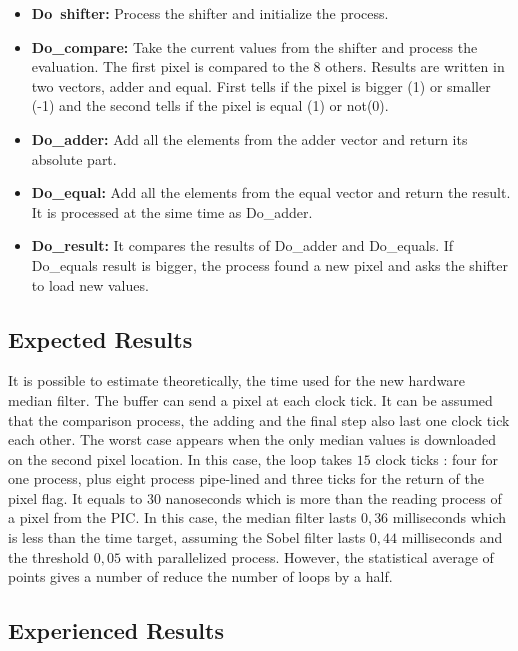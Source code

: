 \documentclass[journal]{IEEEtran}
\begin{document}
\begin{itemize}
\item \textbf{Do\ shifter:} Process the shifter and initialize the process.
\item \textbf{Do\_compare:} Take the current values from the shifter and process the evaluation. The first pixel is compared to the 8 others. Results are written in two vectors, adder and equal. First tells if the pixel is bigger (1) or smaller (-1) and the second tells if the pixel is equal (1) or not(0).

\item \textbf{Do\_adder:} Add all the elements from the adder vector and return its absolute part.
\item \textbf{Do\_equal:} Add all the elements from the equal vector and return the result. It is processed at the sime time as Do\_adder.
\item \textbf{Do\_result:} It compares the results of Do\_adder and Do\_equals. If Do\_equals result is bigger, the process found a new pixel and asks the shifter to load new values.
\end{itemize}

\subsection{Expected Results}

It is possible to estimate theoretically, the time used for the new hardware median filter. The buffer can send a pixel at each clock tick. It can be assumed that the comparison process, the adding and the final step also last one clock tick each other. The worst case appears when the only median values is downloaded on the second pixel location. In this case, the loop takes \(15\) clock ticks : four for one process, plus eight process pipe-lined and three ticks for the return of the pixel flag. It equals to \(30\) nanoseconds which is more than the reading process of a pixel from the PIC. In this case, the median filter lasts \(0,36\) milliseconds which is less than the time target, assuming the Sobel filter lasts \(0,44\) milliseconds and the threshold \(0,05\) with parallelized process. However, the statistical average of points gives a number of reduce the number of loops by a half.

\subsection{Experienced Results}
\end{document}
